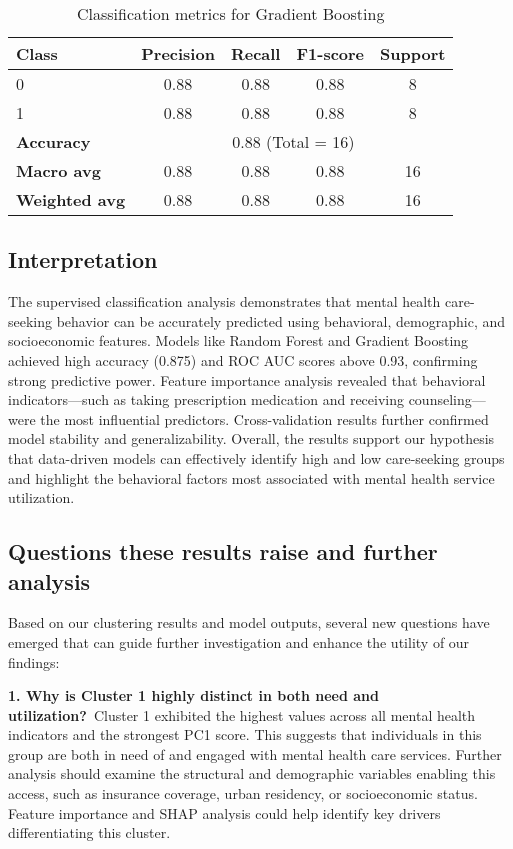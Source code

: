 \documentclass{article}
\begin{document}
\begin{table}[H]
\centering
\begin{tabular}{|l|c|c|c|c|}
\hline
\textbf{Class} & \textbf{Precision} & \textbf{Recall} & \textbf{F1-score} & \textbf{Support} \\
\hline
0 & 0.88 & 0.88 & 0.88 & 8 \\
1 & 0.88 & 0.88 & 0.88 & 8 \\
\hline
\textbf{Accuracy} & \multicolumn{4}{c|}{0.88 (Total = 16)} \\
\textbf{Macro avg} & 0.88 & 0.88 & 0.88 & 16 \\
\textbf{Weighted avg} & 0.88 & 0.88 & 0.88 & 16 \\
\hline
\end{tabular}
\caption{Classification metrics for Gradient Boosting}
\end{table}

\subsection{Interpretation}
The supervised classification analysis demonstrates that mental health care-seeking behavior can be accurately predicted using behavioral, demographic, and socioeconomic features. Models like Random Forest and Gradient Boosting achieved high accuracy (0.875) and ROC AUC scores above 0.93, confirming strong predictive power. Feature importance analysis revealed that behavioral indicators—such as taking prescription medication and receiving counseling—were the most influential predictors. Cross-validation results further confirmed model stability and generalizability. Overall, the results support our hypothesis that data-driven models can effectively identify high and low care-seeking groups and highlight the behavioral factors most associated with mental health service utilization.

\subsection{Questions these results raise and further analysis}

Based on our clustering results and model outputs, several new questions have emerged that can guide further investigation and enhance the utility of our findings:

\vspace{0.3cm}

\textbf{1. Why is Cluster 1 highly distinct in both need and utilization?}\
Cluster 1 exhibited the highest values across all mental health indicators and the strongest PC1 score. This suggests that individuals in this group are both in need of and engaged with mental health care services. Further analysis should examine the structural and demographic variables enabling this access, such as insurance coverage, urban residency, or socioeconomic status. Feature importance and SHAP analysis could help identify key drivers differentiating this cluster.
\end{document}
